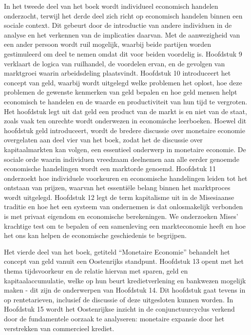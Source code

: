 In het tweede deel van het boek wordt individueel economisch handelen onderzocht, terwijl het derde deel zich richt op economisch handelen binnen een sociale context. Dit gebeurt door de introductie van andere individuen in de analyse en het verkennen van de implicaties daarvan. Met de aanwezigheid van een ander persoon wordt ruil mogelijk, waarbij beide partijen worden gestimuleerd om deel te nemen omdat dit voor beiden voordelig is. Hoofdstuk 9 verklaart de logica van ruilhandel, de voordelen ervan, en de gevolgen van marktgroei waarin arbeidsdeling plaatsvindt. Hoofdstuk 10 introduceert het concept van geld, waarbij wordt uitgelegd welke problemen het oplost, hoe deze problemen de gewenste kenmerken van geld bepalen en hoe geld mensen helpt economisch te handelen en de waarde en productiviteit van hun tijd te vergroten. Het hoofdstuk legt uit dat geld een product van de markt is en niet van de staat, zoals vaak ten onrechte wordt onderwezen in economische leerboeken. Hoewel dit hoofdstuk geld introduceert, wordt de bredere discussie over monetaire economie overgelaten aan deel vier van het boek, zodat het de discussie over kapitaalmarkten kan volgen, een essentieel onderwerp in monetaire economie.
De sociale orde waarin individuen vreedzaam deelnemen aan alle eerder genoemde economische handelingen wordt een marktorde genoemd. Hoofdstuk 11 onderzoekt hoe individuele voorkeuren en economische handelingen leiden tot het ontstaan van prijzen, waarvan het essentiële belang binnen het marktproces wordt uitgelegd. Hoofdstuk 12 legt de term kapitalisme uit in de Misesiaanse traditie en hoe het een systeem van ondernemen is dat onlosmakelijk verbonden is met privaat eigendom en economische berekeningen. We onderzoeken Mises' krachtige test om te bepalen of een samenleving een markteconomie heeft en hoe het ons kan helpen de economische geschiedenis te begrijpen.

Het vierde deel van het boek, getiteld ``Monetaire Economie'' behandelt het concept van geld vanuit een Oostenrijks standpunt. Hoofdstuk 13 opent met het thema tijdsvoorkeur en de relatie hiervan met sparen, geld en kapitaalaccumulatie, welke op hun beurt kredietverlening en bankwezen mogelijk maken - dit zijn de onderwerpen van Hoofdstuk 14. Dit hoofdstuk gaat tevens in op rentetarieven, inclusief de discussie of deze uitgesloten kunnen worden. In Hoofdstuk 15 wordt het Oostenrijkse inzicht in de conjunctuurcyclus verkend door de fundamentele oorzaak te analyseren: monetaire expansie door het verstrekken van commercieel krediet.

